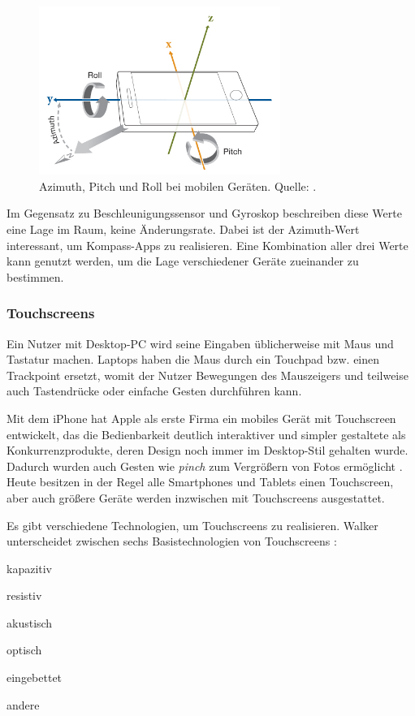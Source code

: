 \begin{figure}[ht]
\centering
\includegraphics[width=0.7\textwidth]{bilder/device_orientation.jpg}
\caption{Azimuth, Pitch und Roll bei mobilen Geräten. Quelle: \citep{Mathworks2014}.}
\label{fig:rotation_axes}
\end{figure}

Im Gegensatz zu Beschleunigungssensor und Gyroskop beschreiben diese Werte eine Lage im Raum, keine Änderungsrate. Dabei ist der Azimuth-Wert interessant, um \zb Kompass-Apps zu realisieren. Eine Kombination aller drei Werte kann genutzt werden, um die Lage verschiedener Geräte zueinander zu bestimmen.

\subsubsection{Touchscreens}
Ein Nutzer mit Desktop-PC wird seine Eingaben üblicherweise mit Maus und Tastatur machen. Laptops haben die Maus durch ein Touchpad bzw. einen Trackpoint ersetzt, womit der Nutzer Bewegungen des Mauszeigers und teilweise auch Tastendrücke oder einfache Gesten durchführen kann. 

Mit dem iPhone hat Apple als erste Firma ein mobiles Gerät mit Touchscreen entwickelt, das die Bedienbarkeit deutlich interaktiver und simpler gestaltete als Konkurrenzprodukte, deren Design noch immer im Desktop-Stil gehalten wurde. Dadurch wurden auch Gesten wie \zb\textit{pinch} zum Vergrößern von Fotos ermöglicht \citep[42]{Banga2014}. Heute besitzen in der Regel alle Smartphones und Tablets einen Touchscreen, aber auch größere Geräte werden inzwischen mit Touchscreens ausgestattet.

Es gibt verschiedene Technologien, um Touchscreens zu realisieren. Walker unterscheidet zwischen sechs Basistechnologien von Touchscreens \citep[35]{Walker2015}:
\begin{enumerate}
\begin{small}
\item kapazitiv
\item resistiv 
\item akustisch
\item optisch
\item eingebettet
\item andere
\end{small}
\end{enumerate}

